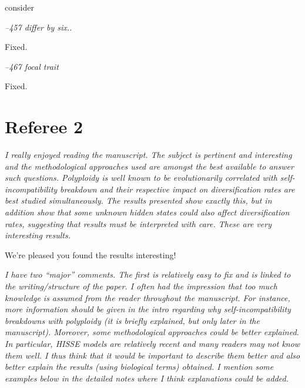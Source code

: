 \documentclass[11pt]{article}
\renewenvironment{quote}{\bigskip\noindent\itshape\ignorespaces}{\smallskip}
\begin{document}
consider %

\begin{quote}
--457  differ by six..
\end{quote}

Fixed.

\begin{quote}
--467  focal trait
\end{quote}

Fixed.

\section{Referee 2}
\vspace{-11pt}

\begin{quote}
I really enjoyed reading the manuscript.
The subject is pertinent and interesting and the methodological approaches used are amongst the best available to answer such questions.
Polyploidy is well known to be evolutionarily correlated with self-incompatibility breakdown and their respective impact on diversification rates are best studied simultaneously.
The results presented show exactly this, but in addition show that some unknown hidden states could also affect diversification rates, suggesting that results must be interpreted with care.
These are very interesting results.
\end{quote}

We're pleased you found the results interesting!

\begin{quote}
I have two ``major'' comments.
The first is relatively easy to fix and is linked to the writing/structure of the paper.
I often had the impression that too much knowledge is assumed from the reader throughout the manuscript.
For instance, more information should be given in the intro regarding why self-incompatibility breakdowns with polyploidy (it is briefly explained, but only later in the manuscript).
Moreover, some methodological approaches could be better explained.
In particular, HISSE models are relatively recent and many readers may not know them well.
I thus think that it would be important to describe them better and also better explain the results (using biological terms) obtained.
I mention some examples below in the detailed notes where I think explanations could be added.
\end{quote}
\end{document}
